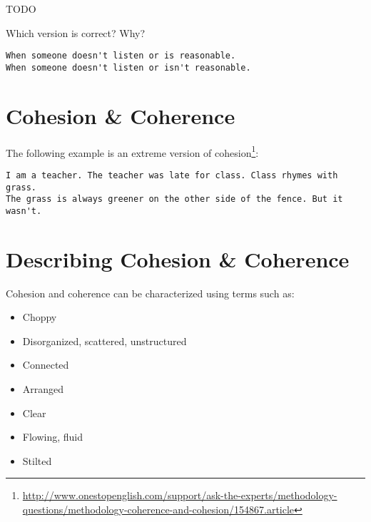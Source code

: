 \documentclass[10pt,a4paper]{book}
\begin{document}
\color{BrickRed}TODO\color{black}





Which version is correct? Why?
\begin{verbatim}
When someone doesn't listen or is reasonable.
When someone doesn't listen or isn't reasonable.
\end{verbatim}


\section{Cohesion \& Coherence}

The following example is an extreme version of cohesion\footnote{\url{http://www.onestopenglish.com/support/ask-the-experts/methodology-questions/methodology-coherence-and-cohesion/154867.article}}:
\begin{verbatim}
I am a teacher. The teacher was late for class. Class rhymes with grass.
The grass is always greener on the other side of the fence. But it wasn't.
\end{verbatim}


\section{Describing Cohesion \& Coherence}

Cohesion and coherence can be characterized using terms such as:
\begin{itemize}
    \itemsep1pt\parskip0pt
    \item Choppy
    \item Disorganized, scattered, unstructured
    \item Connected
    \item Arranged
    \item Clear
    \item Flowing, fluid
    \item Stilted
\end{itemize}
\end{document}
